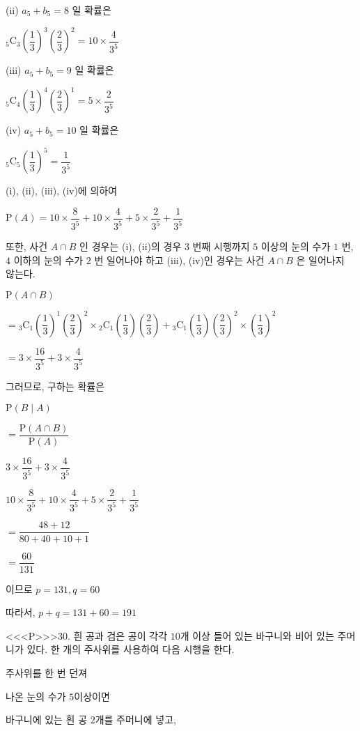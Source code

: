 \documentclass{oblivoir}
\begin{document}
(ii) $a_{5}+b_{5}=8$ 일 확률은

${ }_{5} \mathrm{C}_{3}\left(\dfrac{1}{3}\right)^{3}\left(\dfrac{2}{3}\right)^{2}=10 \times \dfrac{4}{3^{5}}$

(iii) $a_{5}+b_{5}=9$ 일 확률은

${ }_{5} \mathrm{C}_{4}\left(\dfrac{1}{3}\right)^{4}\left(\dfrac{2}{3}\right)^{1}=5 \times \dfrac{2}{3^{5}}$

(iv) $a_{5}+b_{5}=10$ 일 확률은

${ }_{5} \mathrm{C}_{5}\left(\dfrac{1}{3}\right)^{5}=\dfrac{1}{3^{5}}$

(i), (ii), (iii), (iv)에 의하여

$\mathrm{P}(A)=10 \times \dfrac{8}{3^{5}}+10 \times \dfrac{4}{3^{5}}+5 \times \dfrac{2}{3^{5}}+\dfrac{1}{3^{5}}$

또한, 사건 $A \cap B$ 인 경우는 (i), (ii)의 경우 $3$ 번째 시행까지 $5$ 이상의 눈의 수가 $1$ 번, $4$ 이하의 눈의 수가 $2$ 번 일어나야 하고 (iii), (iv)인 경우는 사건 $A \cap B$ 은 일어나지 않는다.

$\mathrm{P}(A \cap B)$

$={ }_{3} \mathrm{C}_{1}\left(\dfrac{1}{3}\right)^{1}\left(\dfrac{2}{3}\right)^{2} \times{ }_{2} \mathrm{C}_{1}\left(\dfrac{1}{3}\right)\left(\dfrac{2}{3}\right) +{ }_{3} \mathrm{C}_{1}\left(\dfrac{1}{3}\right)\left(\dfrac{2}{3}\right)^{2} \times\left(\dfrac{1}{3}\right)^{2} $

$=3 \times \dfrac{16}{3^{5}}+3 \times \dfrac{4}{3^{5}}$

그러므로, 구하는 확률은

$\mathrm{P}(B \mid A)$

$=\dfrac{\mathrm{P}(A \cap B)}{\mathrm{P}(A)}$

$3 \times \dfrac{16}{3^{5}}+3 \times \dfrac{4}{3^{5}}$

$10 \times \dfrac{8}{3^{5}}+10 \times \dfrac{4}{3^{5}}+5 \times \dfrac{2}{3^{5}}+\dfrac{1}{3^{5}}$

$=\dfrac{48+12}{80+40+10+1}$

$=\dfrac{60}{131}$

이므로 $p=131, q=60$

따라서, $p+q=131+60=191$


<<<P>>>30. 흰 공과 검은 공이 각각 $10$개 이상 들어 있는 바구니와 비어 있는 주머니가 있다. 한 개의 주사위를 사용하여 다음 시행을 한다.

주사위를 한 번 던져

나온 눈의 수가 $5$이상이면

바구니에 있는 흰 공 $2$개를 주머니에 넣고,
\end{document}
